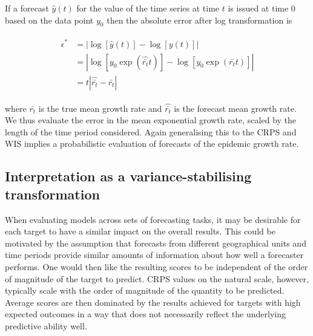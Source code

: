 \documentclass[10pt,letterpaper]{article}
\begin{document}
If a forecast $\hat{y}(t)$ for the value of the time series at time $t$ is issued at time 0 based on the data point $y_0$ then the absolute error after log transformation is
%
\begin{linenomath*}
\begin{align}
\begin{split}
\epsilon^* &= \left| \log \left[ \hat{y}( t ) \right] - \log \left[ y ( t ) \right] \right|\\
           &= \left| \log \left[ y_0 \exp (\hat{\bar{r_t}} t ) \right] - \log \left[ y_0 \exp (\bar{r_t}t) \right] \right|\\
           &= t \left| \hat{\bar{r_t}} - \bar{r_t} \right|
\end{split}
\end{align}
\end{linenomath*}
%
where $\bar{r_t}$ is the true mean growth rate and $\hat{\bar{r_t}}$ is the forecast mean growth rate. We thus evaluate the error in the mean exponential growth rate, scaled by the length of the time period considered. Again generalising this to the CRPS and WIS implies a probabilistic evaluation of forecasts of the epidemic growth rate.

\subsection*{Interpretation as a variance-stabilising transformation}
\label{sec:methods:vst}

When evaluating models across sets of forecasting tasks, it may be desirable for each target to have a similar impact on the overall results. This could be motivated by the assumption that forecasts from different geographical units and time periods provide similar amounts of information about how well a forecaster performs. One would then like the resulting scores to be independent of the order of magnitude of the target to predict. CRPS values on the natural scale, however, typically scale with the order of magnitude of the quantity to be predicted. Average scores are then dominated by the results achieved for targets with high expected outcomes in a way that does not necessarily reflect the underlying predictive ability well.
\end{document}
